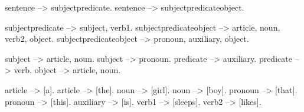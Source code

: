 sentence --> subjectpredicate.
sentence --> subjectpredicateobject.

subjectpredicate --> subject, verb1.
subjectpredicateobject --> article, noun, verb2, object.
subjectpredicateobject --> pronoun, auxiliary, object.

subject --> article, noun.
subject --> pronoun.
predicate --> auxiliary.
predicate --> verb.
object --> article, noun.

article --> [a].
article --> [the].
noun --> [girl].
noun --> [boy].
pronoun --> [that].
pronoun --> [this].
auxiliary --> [is].
verb1 --> [sleeps].
verb2 --> [likes].

